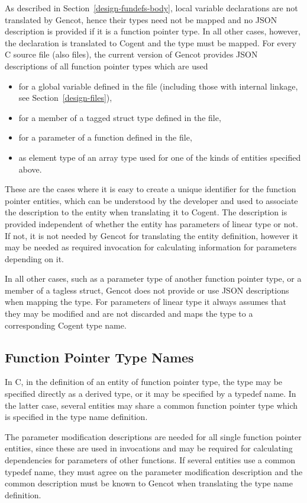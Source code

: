 As described in Section~\ref{design-fundefs-body}, local variable declarations are not translated by Gencot, hence
their types need not be mapped and no JSON description is provided if it is a function pointer type. In all other 
cases, however, the declaration is translated to Cogent and the type must be mapped. For every C source file (also 
 files), the current version of Gencot provides JSON descriptions of all function pointer types which are 
used
\begin{itemize}
\item for a global variable defined in the file (including those with internal linkage, see Section~\ref{design-files}),
\item for a member of a tagged struct type defined in the file,
\item for a parameter of a function defined in the file,
\item as element type of an array type used for one of the kinds of entities specified above.
\end{itemize}
These are the cases where it is easy to create a unique identifier for the function pointer entities, which can be
understood by the developer and used to associate the description to the entity when translating it to Cogent. The
description is provided independent of whether the entity has parameters of linear type or not. If not, it is
not needed by Gencot for translating the entity definition, however it may be needed as required invocation for
calculating information for parameters depending on it.

In all other cases, such as a parameter type of another function pointer type, or a member of a tagless struct,
Gencot does not provide or use
JSON descriptions when mapping the type. For parameters of linear type it always assumes that they may be modified
and are not discarded and maps the type to a corresponding Cogent type name.

\subsection{Function Pointer Type Names}
\label{design-parmod-typedef}

In C, in the definition of an entity of function pointer type, the type may be specified directly as a derived
type, or it may be specified by a typedef name. In the latter case, several entities may share a common
function pointer type which is specified in the type name definition.

The parameter modification descriptions are needed for all single function pointer entities, since these are
used in invocations and may be required for calculating dependencies for parameters of other functions. If 
several entities use a common typedef name, they must agree on the parameter modification description and
the common description must be known to Gencot when translating the type name definition.

